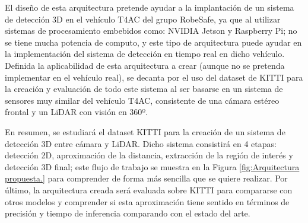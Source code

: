 El diseño de esta arquitectura pretende ayudar a la implantación de un sistema de detección 3D en el vehículo T4AC del grupo RobeSafe, ya que al utilizar sistemas de procesamiento embebidos como: NVIDIA Jetson y Raspberry Pi; no se tiene mucha potencia de computo, y este tipo de arquitectura puede ayudar en la implementación del sistema de detección en tiempo real en dicho vehículo. Definida la aplicabilidad de esta arquitectura a crear (aunque no se pretenda implementar en el vehículo real), se decanta por el uso del dataset de KITTI para la creación y evaluación de todo este sistema al ser basarse en un sistema de sensores muy similar del vehículo T4AC, consistente de una cámara estéreo frontal y un \ac{LiDAR} con visión en 360º.

En resumen, se estudiará el dataset KITTI para la creación de un sistema de detección 3D entre cámara y \ac{LiDAR}. Dicho sistema consistirá en 4 etapas: detección 2D, aproximación de la distancia, extracción de la región de interés y detección 3D final; este flujo de trabajo se muestra en la Figura \ref{fig:Arquitectura propuesta.} para comprender de forma más sencilla que se quiere realizar. Por último, la arquitectura creada será evaluada sobre KITTI para compararse con otros modelos y comprender si esta aproximación tiene sentido en términos de precisión y tiempo de inferencia comparando con el estado del arte.
